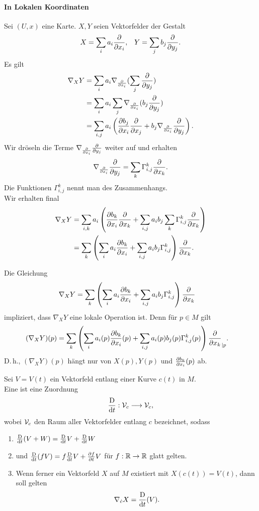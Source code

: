 \paragraph{In Lokalen Koordinaten} Sei $(U,x)$ eine Karte. $X,Y$ seien Vektorfelder der Gestalt
\begin{align*}
X = \sum_ia_i \frac{\partial }{\partial x_i}, && Y = \sum_j b_j\frac{\partial }{\partial y_j}.
\end{align*}
Es gilt
\begin{align*}
\nabla_XY &= \sum_ia_i \nabla_{\frac{\partial }{\partial x_i}} (\sum_j \frac{\partial }{\partial y_j})\\
&= \sum_ia_i\sum_j \nabla_{\frac{\partial }{\partial x_i}} (b_j \frac{\partial }{\partial y_j})\\
&= \sum_{i,j} a_i 
\left(
\frac{\partial b_j}{\partial x_i} \frac{\partial }{\partial x_j} + b_j \nabla_{\frac{\partial }{\partial x_i}} \frac{\partial }{\partial y_j} 
\right).
\end{align*}
Wir dröseln die Terme $\nabla_{\frac{\partial }{\partial x_i}} \frac{\partial }{\partial y_j}$ weiter auf und erhalten
\begin{align*}
\nabla_{\frac{\partial }{\partial x_i}} \frac{\partial }{\partial y_j}  = \sum_k \Gamma_{i,j}^k \frac{\partial }{\partial x_k}.
\end{align*}
Die Funktionen $\Gamma_{i,j}^k$ nennt man  des Zusammenhangs.\\
Wir erhalten final
\begin{align*}
\nabla_XY &= \sum_{i,k} a_i 
\left(
\frac{\partial b_k}{\partial x_i} \frac{\partial }{\partial x_k} +\sum_{i,j} a_i b_j \sum_k \Gamma_{i,j}^k \frac{\partial }{\partial x_k} 
\right)\\
&= \sum_k \left(
\sum_i  a_i \frac{\partial b_k}{\partial x_i}
+
\sum_{i,j} a_i b_j \Gamma_{i,j}^k
\right)
\frac{\partial }{\partial x_k}.
\end{align*}

\Bem{}
Die Gleichung
\begin{align*}
\nabla_XY &= \sum_k \left(
	\sum_i  a_i \frac{\partial b_k}{\partial x_i}
	+
	\sum_{i,j} a_i b_j \Gamma_{i,j}^k
\right)
\frac{\partial }{\partial x_k}
\end{align*}
impliziert, dass $\nabla_X Y$ eine lokale Operation ist. Denn für $p \in M$ gilt
\begin{align*}
(\nabla_XY)(p) &= \sum_k \left(
\sum_i a_i(p) \frac{\partial b_k}{\partial x_i}(p)
+ \sum_{i,j} a_i(p) b_j(p) \Gamma_{i,j}^k(p)
\right)\frac{\partial }{\partial x_k}_{|p}.
\end{align*}
D.\,h., $(\nabla_XY)(p)$ hängt nur von $X(p), Y(p)$ und $\frac{\partial b_k}{\partial x_i}(p)$ ab.

\Def{}
Sei $V = V(t)$ ein Vektorfeld entlang einer Kurve $c(t)$ in $M$.\\
Eine  ist eine Zuordnung
\[ \frac{\text{D}}{\text{d} t} : \mathcal{V}_c \overset{}{\longrightarrow} \mathcal{V}_c, \]
wobei $\mathcal{V}_c$ den Raum aller Vektorfelder entlang $c$ bezeichnet, sodass
\begin{enumerate}[(1)]
	\item $\frac{\text{D}}{\text{d} t}(V+W) = \frac{\text{D}}{\text{d} t}V + \frac{\text{D}}{\text{d} t} W$
	\item und $\frac{\text{D}}{\text{d} t}(fV) = f \frac{\text{D}}{\text{d} t} V + \frac{\partial f}{\partial t} V$ für $f : \mathbb{R} \overset{}{\rightarrow}\mathbb{R}$ glatt gelten.
	\item Wenn ferner ein Vektorfeld $X$ auf $M$ existiert mit $X(c(t)) = V(t)$, dann soll gelten
	\[ \nabla_{\dot{c}}X = \frac{\text{D}}{\text{d} t}(V) .\]
\end{enumerate}

